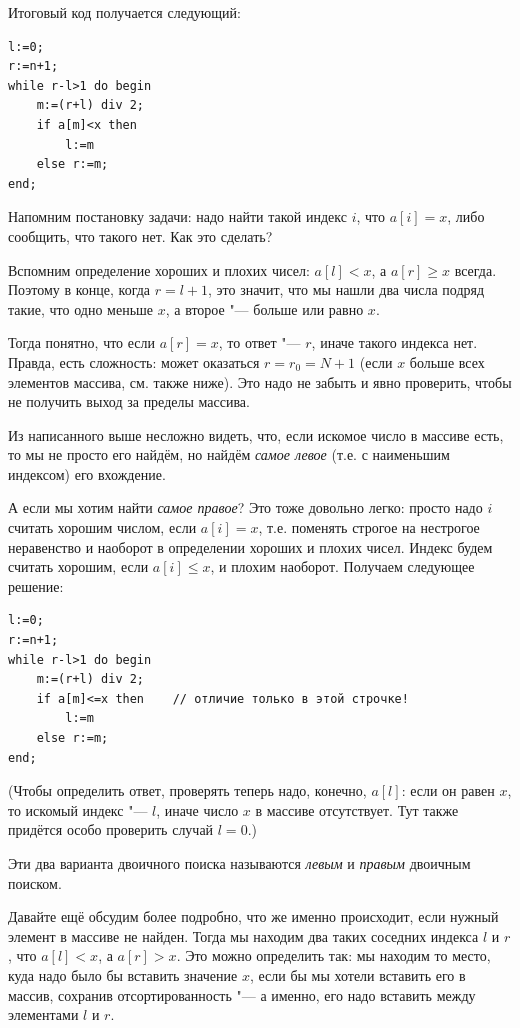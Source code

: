 \documentclass[a4paper,10pt]{problems}
\begin{document}
Итоговый код получается следующий:
\begin{codesampleo}\begin{verbatim}
l:=0;
r:=n+1;  
while r-l>1 do begin    
    m:=(r+l) div 2;
    if a[m]<x then
        l:=m
    else r:=m;
end;
\end{verbatim}
\end{codesampleo}

Напомним постановку задачи: надо найти такой индекс $i$, что $a[i]=x$, либо сообщить,
что такого нет. Как это сделать?

Вспомним определение хороших и плохих чисел: $a[l]<x$, а $a[r]\geq x$ всегда.
Поэтому в конце, когда $r=l+1$, это значит, что мы нашли два числа подряд такие,
что одно меньше $x$, а второе "--- больше или равно $x$.

Тогда понятно, что если $a[r]=x$, то ответ "--- $r$, иначе такого индекса нет.
Правда, есть сложность: может оказаться $r=r_0=N+1$ (если $x$ больше всех элементов массива, см. также ниже). 
Это надо не забыть и явно проверить, чтобы не получить выход за пределы массива.

Из написанного выше несложно видеть, что, если искомое число в массиве есть, то мы не просто его найдём,
но найдём \textit{самое левое} (т.е. с наименьшим индексом) его вхождение.

А если мы хотим найти \textit{самое правое}? 
Это тоже довольно легко: просто надо $i$ считать хорошим числом, если $a[i]=x$, 
т.е. поменять строгое на нестрогое неравенство и наоборот в определении хороших и плохих чисел.
Индекс будем считать хорошим, если $a[i]\leq x$, и плохим наоборот. Получаем следующее решение:
\begin{codesampleo}\begin{verbatim}
l:=0;
r:=n+1;  
while r-l>1 do begin    
    m:=(r+l) div 2;
    if a[m]<=x then    // отличие только в этой строчке!
        l:=m
    else r:=m;
end;
\end{verbatim}
\end{codesampleo}
(Чтобы определить ответ, проверять теперь надо, конечно, $a[l]$: если он равен $x$, 
то искомый индекс "--- $l$,  иначе число $x$ в массиве отсутствует. Тут также придётся особо проверить случай $l=0$.)

Эти два варианта двоичного поиска называются \textit{левым} и \textit{правым} двоичным поиском.

Давайте ещё обсудим более подробно, что же именно происходит, если нужный элемент в массиве не найден.
Тогда мы находим два таких соседних индекса $l$ и $r$, что $a[l]<x$, а $a[r]>x$.
Это можно определить так: мы находим то место, куда надо было бы вставить значение $x$, 
если бы мы хотели вставить его в массив, сохранив отсортированность "--- а именно,
его надо вставить между элементами $l$ и $r$.
\end{document}
